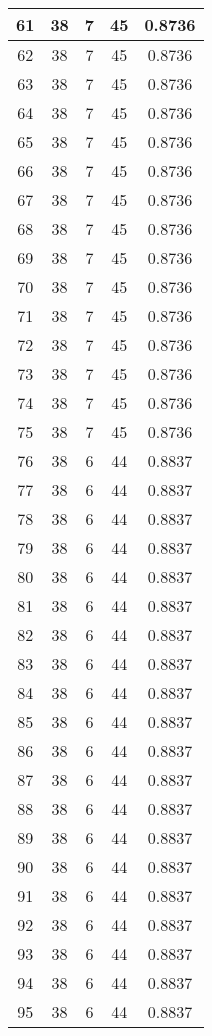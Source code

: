 \documentclass[letterpaper, 12pt]{article}
\begin{document}
\begin{longtable}{|c|c|c|c|c|}
61 & 38 & 7 & 45 & 0.8736 \\
\hline
62 & 38 & 7 & 45 & 0.8736 \\
\hline
63 & 38 & 7 & 45 & 0.8736 \\
\hline
64 & 38 & 7 & 45 & 0.8736 \\
\hline
65 & 38 & 7 & 45 & 0.8736 \\
\hline
66 & 38 & 7 & 45 & 0.8736 \\
\hline
67 & 38 & 7 & 45 & 0.8736 \\
\hline
68 & 38 & 7 & 45 & 0.8736 \\
\hline
69 & 38 & 7 & 45 & 0.8736 \\
\hline
70 & 38 & 7 & 45 & 0.8736 \\
\hline
71 & 38 & 7 & 45 & 0.8736 \\
\hline
72 & 38 & 7 & 45 & 0.8736 \\
\hline
73 & 38 & 7 & 45 & 0.8736 \\
\hline
74 & 38 & 7 & 45 & 0.8736 \\
\hline
75 & 38 & 7 & 45 & 0.8736 \\
\hline
76 & 38 & 6 & 44 & 0.8837 \\
\hline
77 & 38 & 6 & 44 & 0.8837 \\
\hline
78 & 38 & 6 & 44 & 0.8837 \\
\hline
79 & 38 & 6 & 44 & 0.8837 \\
\hline
80 & 38 & 6 & 44 & 0.8837 \\
\hline
81 & 38 & 6 & 44 & 0.8837 \\
\hline
82 & 38 & 6 & 44 & 0.8837 \\
\hline
83 & 38 & 6 & 44 & 0.8837 \\
\hline
84 & 38 & 6 & 44 & 0.8837 \\
\hline
85 & 38 & 6 & 44 & 0.8837 \\
\hline
86 & 38 & 6 & 44 & 0.8837 \\
\hline
87 & 38 & 6 & 44 & 0.8837 \\
\hline
88 & 38 & 6 & 44 & 0.8837 \\
\hline
89 & 38 & 6 & 44 & 0.8837 \\
\hline
90 & 38 & 6 & 44 & 0.8837 \\
\hline
91 & 38 & 6 & 44 & 0.8837 \\
\hline
92 & 38 & 6 & 44 & 0.8837 \\
\hline
93 & 38 & 6 & 44 & 0.8837 \\
\hline
94 & 38 & 6 & 44 & 0.8837 \\
\hline
95 & 38 & 6 & 44 & 0.8837 \\

\end{longtable}
\end{document}
